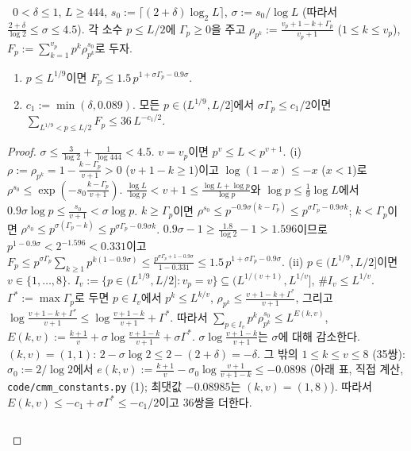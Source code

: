 \begin{lemma}[국소 인자]\label{CMM:lem-local}
\PROVED\ $0<\delta\le1$, $L\ge444$, $s_0:=\lceil(2+\delta)\log_2L\rceil$, $\sigma:=s_0/\log L$ (따라서 $\frac{2+\delta}{\log2}\le\sigma\le4.5$).
각 소수 $p\le L/2$에 $\Gamma_p\ge0$을 주고 $\rho_{p^k}:=\frac{v_p+1-k+\Gamma_p}{v_p+1}$ ($1\le k\le v_p$), $F_p:=\sum_{k=1}^{v_p}p^k\rho_{p^k}^{s_0}$로 두자.
\begin{enumerate}[label=(\roman*)]
\item $p\le L^{1/9}$이면 $F_p\le1.5\,p^{1+\sigma\Gamma_p-0.9\sigma}$.
\item $c_1:=\min(\delta,0.089)$. 모든 $p\in(L^{1/9},L/2]$에서 $\sigma\Gamma_p\le c_1/2$이면 $\sum_{L^{1/9}<p\le L/2}F_p\le36\,L^{-c_1/2}$.
\end{enumerate}
\end{lemma}
\begin{proof}
$\sigma\le\frac{3}{\log2}+\frac1{\log444}<4.5$. $v=v_p$이면 $p^v\le L<p^{v+1}$.
(i) $\rho:=\rho_{p^k}=1-\frac{k-\Gamma_p}{v+1}>0$ ($v+1-k\ge1$)이고 $\log(1-x)\le-x$ ($x<1$)로 $\rho^{s_0}\le\exp(-s_0\frac{k-\Gamma_p}{v+1})$.
$\frac{\log L}{\log p}<v+1\le\frac{\log L+\log p}{\log p}$와 $\log p\le\frac19\log L$에서 $0.9\sigma\log p\le\frac{s_0}{v+1}<\sigma\log p$.
$k\ge\Gamma_p$이면 $\rho^{s_0}\le p^{-0.9\sigma(k-\Gamma_p)}\le p^{\sigma\Gamma_p-0.9\sigma k}$; $k<\Gamma_p$이면 $\rho^{s_0}\le p^{\sigma(\Gamma_p-k)}\le p^{\sigma\Gamma_p-0.9\sigma k}$.
$0.9\sigma-1\ge\frac{1.8}{\log2}-1>1.596$이므로 $p^{1-0.9\sigma}<2^{-1.596}<0.331$이고
$F_p\le p^{\sigma\Gamma_p}\sum_{k\ge1}p^{k(1-0.9\sigma)}\le\frac{p^{\sigma\Gamma_p+1-0.9\sigma}}{1-0.331}\le1.5\,p^{1+\sigma\Gamma_p-0.9\sigma}$.
(ii) $p\in(L^{1/9},L/2]$이면 $v\in\{1,\dots,8\}$. $I_v:=\{p\in(L^{1/9},L/2]:v_p=v\}\subseteq(L^{1/(v+1)},L^{1/v}]$, $\#I_v\le L^{1/v}$.
$\Gamma^*:=\max\Gamma_p$로 두면 $p\in I_v$에서 $p^k\le L^{k/v}$, $\rho_{p^k}\le\frac{v+1-k+\Gamma^*}{v+1}$, 그리고
$\log\frac{v+1-k+\Gamma^*}{v+1}\le\log\frac{v+1-k}{v+1}+\Gamma^*$. 따라서
$\sum_{p\in I_v}p^k\rho_{p^k}^{s_0}\le L^{E(k,v)}$, $E(k,v):=\frac{k+1}v+\sigma\log\frac{v+1-k}{v+1}+\sigma\Gamma^*$.
$\sigma\log\frac{v+1-k}{v+1}$는 $\sigma$에 대해 감소한다. $(k,v)=(1,1)$: $2-\sigma\log2\le2-(2+\delta)=-\delta$.
그 밖의 $1\le k\le v\le8$ (35쌍): $\sigma_0:=2/\log2$에서 $e(k,v):=\frac{k+1}v-\sigma_0\log\frac{v+1}{v+1-k}\le-0.0898$ (아래 표, 직접 계산,
\texttt{code/cmm\_constants.py} (1); 최댓값 $-0.08985$는 $(k,v)=(1,8)$). 따라서 $E(k,v)\le-c_1+\sigma\Gamma^*\le-c_1/2$이고 36쌍을 더한다.
\begin{center}\small
\begin{tabular}{c|l}

\end{tabular}
\end{center}
\end{proof}
